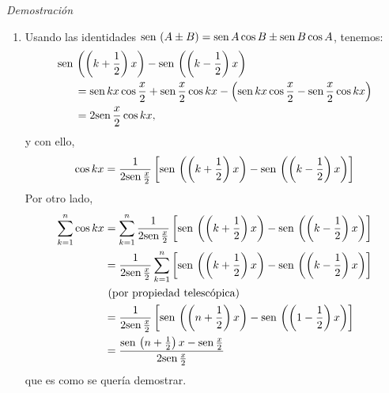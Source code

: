 \textit{Demostración}


\begin{enumerate}[leftmargin=1.2em,   itemindent=0pt,       labelwidth=\labelwidth,
	labelsep=0.5em,]
\item [a)] Usando las identidades $\text{\rm sen}\,\left( A\pm B\right) =\text{\rm sen}\, A\cos B\pm \text{\rm sen}\, B\cos A$, tenemos:
\begin{align*}
\text{\rm sen}\,&\left( \left( k+\frac{1}{2}\right) x\right) -\text{\rm sen}\,\left( \left( k-\frac{1}{2}\right) x\right)\\
&=\text{\rm sen}\, kx\cos\frac{x}{2}+\text{\rm sen}\,\frac{x}{2}\cos kx-
 \left(\text{\rm sen}\, kx\cos \frac{x}{2}-\text{\rm sen}\,\frac{x}{2}\cos kx\right)\\
&=2\text{\rm sen}\,\frac{x}{2}\cos kx,
\end{align*}
y con ello,
\[
\cos kx=\frac{1}{2\sen\frac{x}{2}}\left[ \sen\left( \left( k+\frac{1}{2%
}\right) x\right) -\sen\left( \left( k-\frac{1}{2}\right) x\right) \right]
\]
Por otro lado,
\begin{align*}
\sum\limits_{k=1}^{n}\cos kx&=\sum\limits_{k=1}^{n}\frac{1}{2\text{\rm sen}\,\frac{x}{2}}\left[\text{\rm sen}\,\left( \left( k+\frac{1}{2}\right) x\right) -\text{\rm sen}\,\left( \left( k-\frac{1}{2}\right) x\right) \right]\\
&=\frac{1}{2\text{\rm sen}\,\frac{x}{2}}\sum\limits_{k=1}^{n}\left[\text{\rm sen}\,\left( \left( k+\frac{1}{2}\right) x\right) -\text{\rm sen}\,\left( \left( k-\frac{1}{2}\right) x\right)\right]\\
&\text{ (por propiedad telescópica)}\\
&=\frac{1}{2\text{\rm sen}\,\frac{x}{2}}\left[ \text{\rm sen}\,\left( \left( n+\frac{1}{2}\right)
x\right) -\text{\rm sen}\,\left( \left( 1-\frac{1}{2}\right) x\right) \right]\\
&=\frac{\text{\rm sen}\,\left( n+\frac{1}{2}\right) x-\text{\rm sen}\, \frac{x}{2} }{2\text{\rm sen}\,\frac{x}{2}}
\end{align*}
que es como se quería demostrar.


\end{enumerate}
